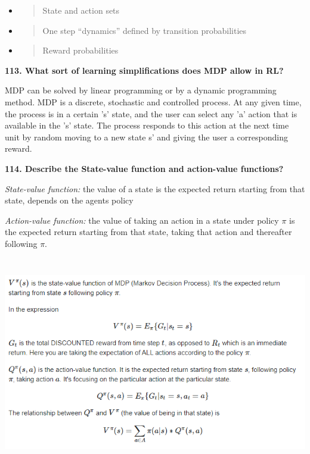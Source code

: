 \begin{itemize}
\item
  \begin{quote}
  State and action sets
  \end{quote}
\item
  \begin{quote}
  One step ``dynamics'' defined by transition probabilities
  \end{quote}
\item
  \begin{quote}
  Reward probabilities
  \end{quote}
\end{itemize}

\textbf{113. What sort of learning simplifications does MDP allow in
RL?}

MDP can be solved by linear programming or by a dynamic programming
method. MDP is a discrete, stochastic and controlled process. At any
given time, the process is in a certain 's' state, and the user can
select any 'a' action that is available in the 's' state. The process
responds to this action at the next time unit by random moving to a new
state s' and giving the user a corresponding reward.

\textbf{114. Describe the State-value function and action-value
functions?}

\textit{State-value function:} the value of a state is the expected
return starting from that state, depends on the agents policy

\textit{Action-value function:} the value of taking an action in a
state under policy $\pi$ is the expected return starting from that state,
taking that action and thereafter following $\pi$.

\includegraphics[width=6.26772in,height=3.63889in]{media/image8.png}

